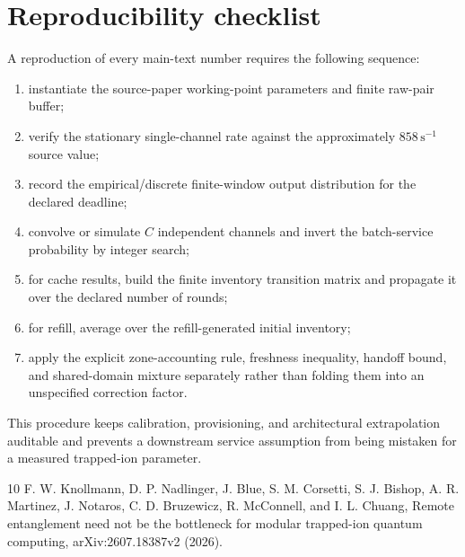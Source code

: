 \documentclass[aps,prx,preprint,superscriptaddress,nofootinbib,longbibliography]{revtex4-2}
\begin{document}
\section{Reproducibility checklist}
A reproduction of every main-text number requires the following sequence:
\begin{enumerate}
\item instantiate the source-paper working-point parameters and finite raw-pair buffer;
\item verify the stationary single-channel rate against the approximately $858\,\mathrm{s}^{-1}$ source value;
\item record the empirical/discrete finite-window output distribution for the declared deadline;
\item convolve or simulate $C$ independent channels and invert the batch-service probability by integer search;
\item for cache results, build the finite inventory transition matrix and propagate it over the declared number of rounds;
\item for refill, average over the refill-generated initial inventory;
\item apply the explicit zone-accounting rule, freshness inequality, handoff bound, and shared-domain mixture separately rather than folding them into an unspecified correction factor.
\end{enumerate}
This procedure keeps calibration, provisioning, and architectural extrapolation auditable and prevents a downstream service assumption from being mistaken for a measured trapped-ion parameter.

\begin{thebibliography}{10}
 F. W. Knollmann, D. P. Nadlinger, J. Blue, S. M. Corsetti, S. J. Bishop, A. R. Martinez, J. Notaros, C. D. Bruzewicz, R. McConnell, and I. L. Chuang, Remote entanglement need not be the bottleneck for modular trapped-ion quantum computing, arXiv:2607.18387v2 (2026).
\end{thebibliography}
\end{document}
